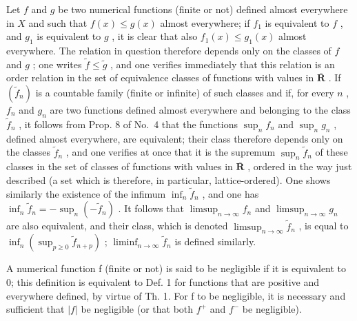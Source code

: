 Let \(f\) and \(g\) be two numerical functions (finite or not) defined almost everywhere in \(X\) and such that \(f(x) \leqslant g(x)\) almost everywhere; if \(f_1\) is equivalent to \(f\) , and \(g_1\) is equivalent to \(g\) , it is clear that also \(f_1(x) \leqslant g_1(x)\) almost everywhere. The relation in question therefore depends only on the classes of \(f\) and \(g\) ; one writes \(\widetilde{f} \leqslant \widetilde{g}\) , and one verifies immediately that this relation is an order relation in the set of equivalence classes of functions with values in \(\overline{\mathbf{R}}\) . If \((\widetilde{f}_n)\) is a countable family (finite or infinite) of such classes and if, for every \(n\) , \(f_n\) and \(g_n\) are two functions defined almost everywhere and belonging to the class \(\widetilde{f}_n\) , it follows from Prop. 8 of No.~4 that the functions \(\sup_n f_n\) and \(\sup_n g_n\) , defined almost everywhere, are equivalent; their class therefore depends only on the classes \(\widetilde{f}_n\) , and one verifies at once that it is the supremum \(\sup_n \widetilde{f}_n\) of these classes in the set of classes of functions with values in \(\overline{\mathbf{R}}\) , ordered in the way just described (a set which is therefore, in particular, lattice-ordered). One shows similarly the existence of the infimum \(\inf_n \widetilde{f}_n\) , and one has \(\inf_n \widetilde{f}_n = -\sup_n (-\widetilde{f}_n)\) . It follows that \(\limsup_{n \to \infty} f_n\) and \(\limsup_{n \to \infty} g_n\) are also equivalent, and their class, which is denoted \(\limsup_{n \to \infty} \widetilde{f}_n\) , is equal to \(\inf_n (\sup_{p \geqslant 0} \widetilde{f}_{n+p})\) ; \(\liminf_{n \to \infty} \widetilde{f}_n\) is defined similarly.

A numerical function f (finite or not) is said to be negligible if it is equivalent to 0; this definition is equivalent to Def. 1 for functions that are positive and everywhere defined, by virtue of Th. 1. For f to be negligible, it is necessary and sufficient that \(|f|\) be negligible (or that both \(f^{+}\) and \(f^{-}\) be negligible).

